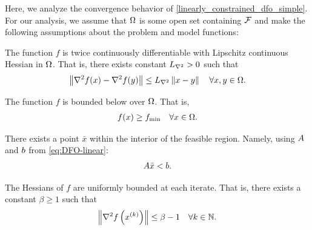 Here,  we analyze the convergence behavior of \cref{linearly_constrained_dfo_simple}.
For our analysis, we assume that $\Omega$ is some open set containing ${\mathcal F}$ and make the following assumptions about the problem and model functions:

\begin{assumption}
\label{for_fully_quadratic}
\label{lipschitz_hessian}
The function $f$ is twice continuously differentiable with Lipschitz continuous Hessian in $\Omega$.   That is, there exists constant ${L_{\nabla^2}} > 0$ such that 
\begin{align}
\left\|\nabla^2 f(x) - \nabla^2 f(y)\right\| \le {L_{\nabla^2}} \left\|x - y\right\| \quad \forall x, y \in \Omega.
\end{align}
\end{assumption}




\begin{assumption}
\label{lower_bound}
The function $f$ is bounded below over $\Omega$.
That is,
\begin{align}
f(x) \ge f_{\text{min}} \quad \forall x \in \Omega.
\end{align}
\end{assumption}

\begin{assumption}
\label{interior_point}
There exists a point $\bar x$ within the interior of the feasible region.
Namely, using ${A}$ and ${b}$ from \cref{eq:DFO-linear}:
\begin{align}
{A} \bar x < {b}.
\end{align}
\end{assumption}


\begin{assumption}
\label{uniformly_bounded_hessians_of_f}
The Hessians of $f$ are uniformly bounded at each iterate. That is, there exists a constant $\beta \ge 1$ such that
\begin{align*}
\left\|\nabla^2 f\left(x^{(k)}\right)\right\| \le \beta - 1\quad \forall k \in \mathbb N.
\end{align*}
\end{assumption}


